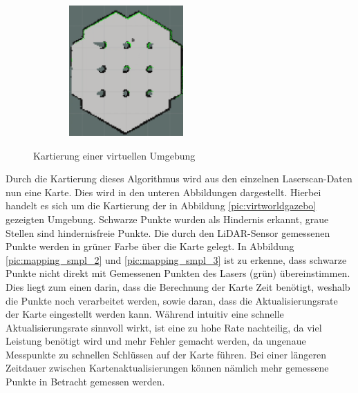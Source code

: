 {{\begin{figure}[H]
			\qquad %
			\begin{subfigure}[h]{.33\linewidth}
				\centering
				\includegraphics[scale=0.6, height =5cm, width=5cm]{Bilder/mapping_smpl_4.png}
				\label{pic:mapping_smpl_4}
			\end{subfigure}%
			\caption{Kartierung einer virtuellen Umgebung}
			\label{pic:mapping_smpl}
		\end{figure}
	
		Durch die Kartierung dieses Algorithmus wird aus den einzelnen Laserscan-Daten nun eine Karte. Dies wird in den unteren Abbildungen dargestellt. Hierbei handelt es sich um die Kartierung der in Abbildung \ref{pic:virtworldgazebo} gezeigten Umgebung. Schwarze Punkte wurden als Hindernis erkannt, graue Stellen sind hindernisfreie Punkte. Die durch den LiDAR-Sensor gemessenen Punkte werden in grüner Farbe über die Karte gelegt. In Abbildung \ref{pic:mapping_smpl_2} und \ref{pic:mapping_smpl_3} ist zu erkenne, dass schwarze Punkte nicht direkt mit Gemessenen Punkten des Lasers (grün) übereinstimmen. Dies liegt zum einen darin, dass die Berechnung der Karte Zeit benötigt, weshalb die Punkte noch verarbeitet werden, sowie daran, dass die Aktualisierungsrate der Karte eingestellt werden kann. Während intuitiv eine schnelle Aktualisierungsrate sinnvoll wirkt, ist eine zu hohe Rate nachteilig, da viel Leistung benötigt wird und mehr Fehler gemacht werden, da ungenaue Messpunkte zu schnellen Schlüssen auf der Karte führen. Bei einer längeren Zeitdauer zwischen Kartenaktualisierungen können nämlich mehr gemessene Punkte in Betracht gemessen werden.
	}
}
